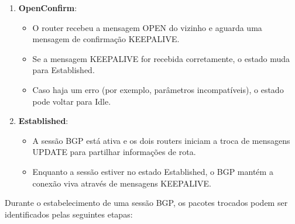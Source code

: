 \documentclass[11pt,english, openright, oneside]{book}
\begin{document}
\begin{enumerate}
\begin{enumerate}
    \item \textbf{OpenConfirm}: 
    \begin{itemize}
      \item O router recebeu a mensagem OPEN do vizinho e aguarda uma mensagem de confirmação KEEPALIVE.
      \item Se a mensagem KEEPALIVE for recebida corretamente, o estado muda para Established.
      \item Caso haja um erro (por exemplo, parâmetros incompatíveis), o estado pode voltar para Idle.
    \end{itemize}
    \item \textbf{Established}:
    \begin{itemize}
      \item A sessão BGP está ativa e os dois routers iniciam a troca de mensagens UPDATE para partilhar informações de rota.
      \item Enquanto a sessão estiver no estado Established, o BGP mantém a conexão viva através de mensagens KEEPALIVE.
    \end{itemize}
  \end{enumerate}

  \vspace{0.2cm}
  Durante o estabelecimento de uma sessão BGP, os pacotes trocados podem ser identificados pelas seguintes etapas:


\end{enumerate}
\end{document}
